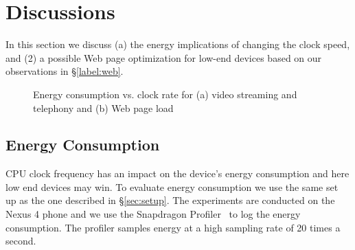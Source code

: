 \section{Discussions}
\label{sec:energy}

In this section we discuss (a) the energy implications of changing the clock speed, and (2) a possible Web page optimization for low-end devices based on our observations in \S\ref{label:web}.

\begin{figure}[t]
  \centering
  
  \caption{Energy consumption vs. clock rate for
  (a) video streaming and telephony and (b) Web page load}
\label{fig:power-video-web}
\end{figure}


\subsection{Energy Consumption}
CPU clock frequency has an impact on the device's energy consumption and here low end devices may win. To evaluate 
energy consumption we use the same set up as the one described in \S\ref{sec:setup}. The experiments are conducted on the Nexus 4 phone and we use the Snapdragon Profiler~\cite{qualsnap} to log the energy consumption. The profiler samples energy at a high sampling rate of 20 times a second. %

